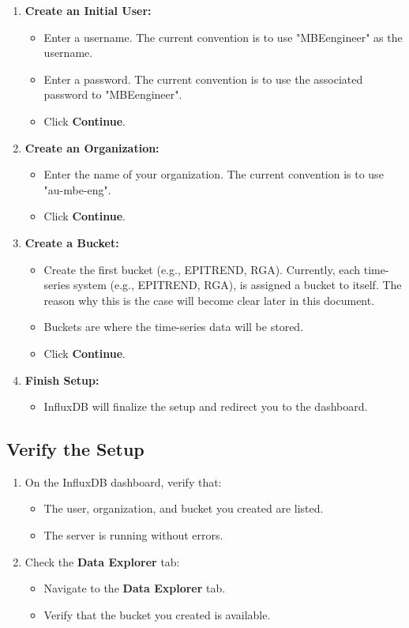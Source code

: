 \documentclass{article}
\begin{document}
\begin{enumerate}
    \item \textbf{Create an Initial User:}
    \begin{itemize}
        \item Enter a username. The current convention is to use "MBEengineer" as the username.
        \item Enter a password. The current convention is to use the associated password to "MBEengineer".
        \item Click \textbf{Continue}.
    \end{itemize}
    \item \textbf{Create an Organization:}
    \begin{itemize}
        \item Enter the name of your organization. The current convention is to use "au-mbe-eng".
        \item Click \textbf{Continue}.
    \end{itemize}
    \item \textbf{Create a Bucket:}
    \begin{itemize}
        \item Create the first bucket (e.g., EPITREND, RGA). Currently, each time-series system (e.g., EPITREND, RGA), is assigned a bucket to itself. The reason why this is the case will become clear later in this document.
        \item Buckets are where the time-series data will be stored.
        \item Click \textbf{Continue}.
    \end{itemize}
    \item \textbf{Finish Setup:}
    \begin{itemize}
    \item InfluxDB will finalize the setup and redirect you to the dashboard.
    \end{itemize}
\end{enumerate}

\subsection{Verify the Setup}
\begin{enumerate}
    \item On the InfluxDB dashboard, verify that:
    \begin{itemize}
        \item The user, organization, and bucket you created are listed.
        \item The server is running without errors.
    \end{itemize}
    \item Check the \textbf{Data Explorer} tab:
    \begin{itemize}
        \item Navigate to the \textbf{Data Explorer} tab.
        \item Verify that the bucket you created is available.
    \end{itemize}
\end{enumerate}
\end{document}
